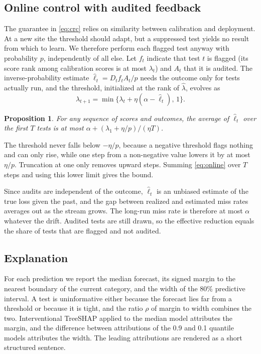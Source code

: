 \documentclass[conference]{IEEEtran}
\newtheorem{proposition}{Proposition}
\begin{document}
\subsection{Online control with audited feedback}
The guarantee in \eqref{eq:crc} relies on similarity between calibration and deployment. At a new site the threshold should adapt, but a suppressed test yields no result from which to learn. We therefore perform each flagged test anyway with probability $p$, independently of all else. Let $f_t$ indicate that test $t$ is flagged (its score rank among calibration scores is at most $\lambda_t$) and $A_t$ that it is audited. The inverse-probability estimate $\hat\ell_t=D_tf_tA_t/p$ needs the outcome only for tests actually run, and the threshold, initialized at the rank of $\hat\lambda$, evolves as
\begin{equation}
\lambda_{t+1}=\min\big\{\lambda_t+\eta(\alpha-\hat\ell_t),\,1\big\}.
\label{eq:online}
\end{equation}

\begin{proposition}
For any sequence of scores and outcomes, the average of $\hat\ell_t$ over the first $T$ tests is at most $\alpha+(\lambda_1+\eta/p)/(\eta T)$.
\end{proposition}
\begin{IEEEproof}
The threshold never falls below $-\eta/p$, because a negative threshold flags nothing and can only rise, while one step from a non-negative value lowers it by at most $\eta/p$. Truncation at one only removes upward steps. Summing \eqref{eq:online} over $T$ steps and using this lower limit gives the bound.
\end{IEEEproof}

Since audits are independent of the outcome, $\hat\ell_t$ is an unbiased estimate of the true loss given the past, and the gap between realized and estimated miss rates averages out as the stream grows. The long-run miss rate is therefore at most $\alpha$ whatever the drift. Audited tests are still drawn, so the effective reduction equals the share of tests that are flagged and not audited.

\subsection{Explanation}
For each prediction we report the median forecast, its signed margin to the nearest boundary of the current category, and the width of the 80\% predictive interval. A test is uninformative either because the forecast lies far from a threshold or because it is tight, and the ratio $\rho$ of margin to width combines the two. Interventional TreeSHAP \cite{lundberg2017unified,lundberg2020trees} applied to the median model attributes the margin, and the difference between attributions of the 0.9 and 0.1 quantile models attributes the width. The leading attributions are rendered as a short structured sentence.
\end{document}
